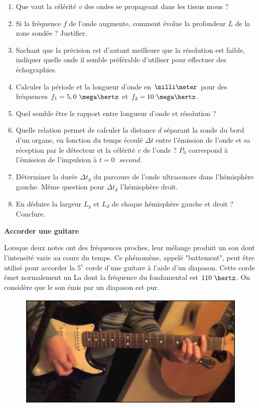 \begin{enumerate}
\item Que vaut la célérité $v$ des ondes se propageant dans les tissus mous ?
\item Si la fréquence $f$ de l'onde augmente, comment évolue la profondeur $L$ de la zone sondée ? Justifier.
\item Sachant que la précision est d'autant meilleure que la résolution est faible, indiquer quelle onde il semble préférable d'utiliser pour effectuer des échographies.
\item Calculer la période et la longueur d'onde en $\milli\meter$ pour des fréquences $f_{1} = 5,0\text{ }\mega\hertz$ et $f_{2} = 10\text{ }\mega\hertz$.
\item Quel semble être le rapport entre longueur d'onde et résolution ?
\newpage
\item Quelle relation permet de calculer la distance $d$ séparant la sonde du bord d'un organe, en fonction du temps écoulé $\Delta t$ entre l'émission de l'onde et sa réception par le détecteur et la célérité $v$ de l'onde ?
$P_{0}$ correspond à l'émission de l'impulsion à $t = 0\text{ }second$.
\item Déterminer la durée $\Delta t_{g}$ du parcours de l'onde ultrasonore dans l'hémisphère gauche. Même question
pour $\Delta t_{d}$ l'hémisphère droit.
\item En déduire la largeur $L_{g}$ et $L_{d}$ de chaque hémisphère gauche et droit ? Conclure.
\end{enumerate}

\vspace{0.3cm}

\exo \textbf{Accorder une guitare}

\vspace{0.3cm}

Lorsque deux notes ont des fréquences proches, leur mélange produit un son dont l'intensité varie au cours du temps. Ce phénomène, appelé "battement", peut être utilisé pour accorder la $5^{e}$ corde d'une guitare à l'aide d'un diapason. Cette corde émet normalement un La dont la fréquence du fondamental est $110\text{ }\hertz$. On considère que le son émis par un diapason est pur.

\begin{figure}[h]
\begin{center}
\includegraphics[width=0.75\columnwidth]{images/Exo2_Ondes_Guitare}
\end{center}
\end{figure}

